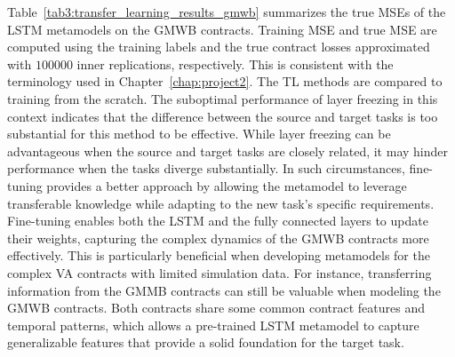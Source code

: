 Table~\ref{tab3:transfer_learning_results_gmwb} summarizes the true MSEs of the LSTM metamodels on the GMWB contracts.
Training MSE and true MSE are computed using the training labels and the true contract losses approximated with $\num{100000}$ inner replications, respectively.
This is consistent with the terminology used in Chapter~\ref{chap:project2}.
The TL methods are compared to training from the scratch.
The suboptimal performance of layer freezing in this context indicates that the difference between the source and target tasks is too substantial for this method to be effective. 
While layer freezing can be advantageous when the source and target tasks are closely related, it may hinder performance when the tasks diverge substantially.
In such circumstances, fine-tuning provides a better approach by allowing the metamodel to leverage transferable knowledge while adapting to the new task's specific requirements. 
Fine-tuning enables both the LSTM and the fully connected layers to update their weights, capturing the complex dynamics of the GMWB contracts more effectively.
This is particularly beneficial when developing metamodels for the complex VA contracts with limited simulation data. 
For instance, transferring information from the GMMB contracts can still be valuable when modeling the GMWB contracts.
Both contracts share some common contract features and temporal patterns, which allows a pre-trained LSTM metamodel to capture generalizable features that provide a solid foundation for the target task.

